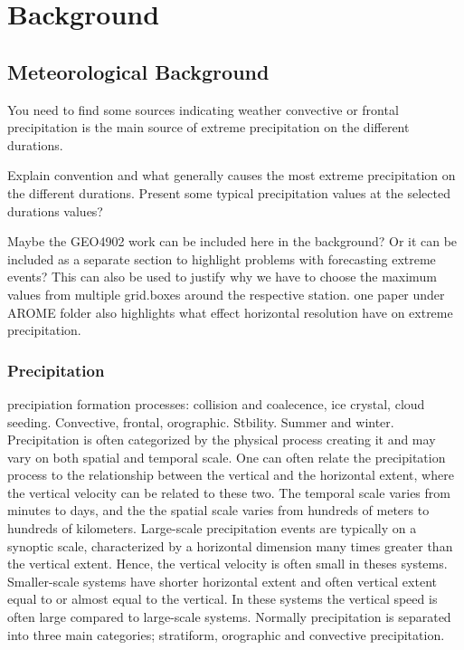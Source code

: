 \section{Background}
\label{sec:background}

\subsection{Meteorological Background}

You need to find some sources indicating weather convective or frontal precipitation is the main source of extreme precipitation on the different durations. 

Explain convention and what generally causes the most extreme precipitation on the different durations. Present some typical precipitation values at the selected durations values?

Maybe the GEO4902 work can be included here in the background? Or it can be included as a separate section to highlight problems with forecasting extreme events? This can also be used to justify why we have to choose the maximum values from multiple grid.boxes around the respective station.   
one paper under AROME folder also highlights what effect horizontal resolution have on extreme precipitation. 

\subsubsection{Precipitation}
precipiation formation processes: collision and coalecence, ice crystal, cloud seeding. Convective, frontal, orographic. Stbility. Summer and winter. 
Precipitation is often categorized by the physical process creating it and may vary on both spatial and temporal scale. One can often relate the precipitation process to the relationship between the vertical and the horizontal extent, where the vertical velocity can be related to these two. The temporal scale varies from minutes to days, and the the spatial scale varies from hundreds of meters to hundreds of kilometers. Large-scale precipitation events are typically on a synoptic scale, characterized by a horizontal dimension many times greater than the vertical extent. Hence, the vertical velocity is often small in theses systems. Smaller-scale systems have shorter horizontal extent and often vertical extent equal to or almost equal to the vertical. In these systems the vertical speed is often large compared to large-scale systems. Normally precipitation is separated into three main categories; stratiform, orographic and convective precipitation.

